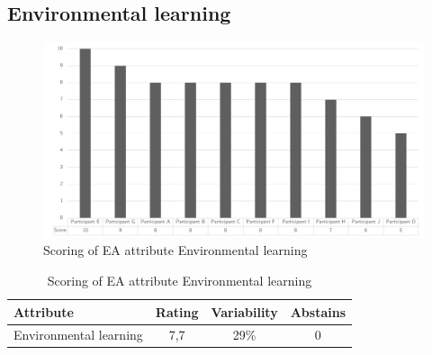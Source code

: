 \subsection{Environmental learning}
\begin{figure}[H]
	\centering
	\includegraphics[width=0.9\linewidth]{images/scoreeaenvironmentallearning}
	\caption[Scoring of EA attribute Environmental learning]{Scoring of EA attribute Environmental learning}
	\label{fig:appscoringeaenvironmentallearning}
\end{figure}
\begin{table}[H]
	\centering
	\begin{tabular}{p{}ccc}
		\toprule
		\textbf{Attribute} & \textbf{Rating} & \textbf{Variability} & \textbf{Abstains} \\
		\midrule
		Environmental learning & 7,7 & 29\% & 0 \\%
		\bottomrule
	\end{tabular}%
	\caption[Scoring of EA attribute Environmental learning]{Scoring of EA attribute Environmental learning}
	\label{tab:appscoringeaenvironmentallearning}%
\end{table}%
\newpage
